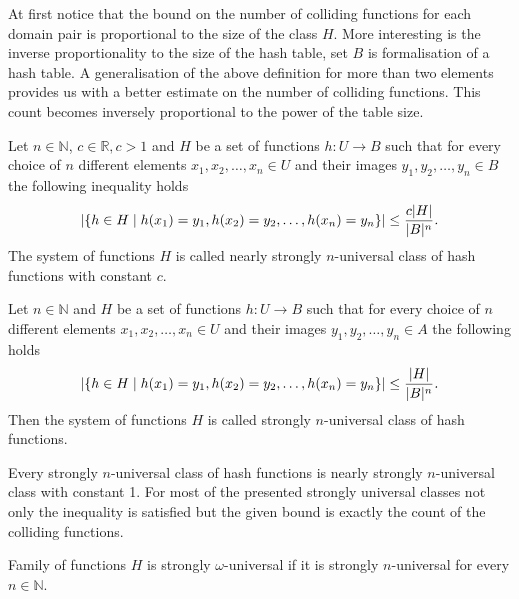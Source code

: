 At first notice that the bound on the number of colliding functions for each domain pair is proportional to the size of the class $H$. More interesting is the inverse proportionality to the size of the hash table, set $B$ is formalisation of a hash table. A generalisation of the above definition for more than two elements provides us with a better estimate on the number of colliding functions. This count becomes inversely proportional to the power of the table size.

\begin{definition}
\label{nearly_strong_universal_n_system}
Let $n \in \mathbb{N}$, $c \in \mathbb{R}, c > 1$ and $H$ be a set of functions $h: U \rightarrow B$ such that for every choice of $n$ different elements $x_1, x_2, \dots, x_n \in U$ and their images $y_1, y_2, \dots, y_n \in B$ the following inequality holds
\[ 
	\left|\lbrace h \in H \mid h(x_1) = y_1, h(x_2) = y_2, \dots, h(x_n) = y_n \rbrace \right| \leq \frac{c|H|}{|B|^n} \textit{.} 
\] 
The system of functions $H$ is called nearly strongly $n$-universal class of hash functions with constant $c$.
\end{definition}

\begin{definition}
\label{strong_universal_n_system}
Let $n \in \mathbb{N}$ and $H$ be a set of functions $h: U \rightarrow B$ such that for every choice of $n$ different elements $x_1, x_2, \dots, x_n \in U$ and their images $y_1, y_2, \dots, y_n \in A$ the following holds \[ \left|\lbrace h \in H \mid h(x_1) = y_1, h(x_2) = y_2, \dots, h(x_n) = y_n \rbrace \right| \leq \frac{|H|}{|B|^n} \textit{.} \] Then the system of functions $H$ is called strongly $n$-universal class of hash functions.
\end{definition}

Every strongly $n$-universal class of hash functions is nearly strongly $n$-universal class with constant 1. For most of the presented strongly universal classes not only the inequality is satisfied but the given bound is exactly the count of the colliding functions.

\begin{definition}
\label{strong_universal_omega_system}
Family of functions $H$ is strongly $\omega$-universal if it is strongly $n$-universal for every $n \in \mathbb{N}$.
\end{definition}

